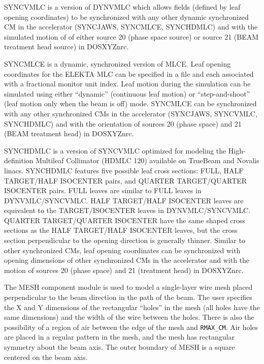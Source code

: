 \documentclass[12pt,twoside]{article}
\begin{document}
SYNCVMLC is a version of DYNVMLC which allows fields (defined by leaf opening
coordinates) to be synchronized with any other dynamic synchronized CM in
the accelerator (SYNCJAWS, SYNCMLCE, SYNCHDMLC) and with the simulated motion of
of either source 20 (phase space source) or source 21 (BEAM treatment head source)
in DOSXYZnrc\cite{Wa05}.

SYNCMLCE is a dynamic, synchronized version of MLCE.  Leaf opening coordinates for
the ELEKTA MLC
can be specified in a file and each associated with a fractional monitor
unit index.  Leaf motion during the simulation can be simulated using
either ``dynamic'' (continuous leaf motion) or ``step-and-shoot'' (leaf motion
only when the beam is off) mode.  SYNCMLCE can be synchronized with any
other synchronized CMs in the accelerator (SYNCJAWS, SYNCVMLC, SYNCHDMLC) and
with the orientation of sources 20 (phase space) and 21 (BEAM treatment head) in
DOSXYZnrc\cite{Wa05}.

SYNCHDMLC is a version of SYNCVMLC optimized for modeling the High-definition Multileaf
Collimator (HDMLC 120) available on TrueBeam and Novalis linacs.  SYNCHDMLC features five
possible leaf cross sections: FULL, HALF TARGET/HALF ISOCENTER pairs, and QUARTER TARGET/QUARTER ISOCENTER
pairs.  FULL leaves are similar to FULL leaves in DYNVMLC/SYNCVMLC.  HALF TARGET/HALF ISOCENTER leaves are
equivalent to the TARGET/ISOCENTER leaves in DYNVMLC/SYNCVMLC. QUARTER TARGET/QUARTER ISOCENTER have the
same shaped cross sections as the HALF TARGET/HALF ISOCENTER leaves, but the cross section perpendicular to
the opening direction is generally thinner.  Similar to other synchronized CMs, leaf opening
coordinates can be synchronized with opening dimensions of other synchronized CMs in the accelerator
and with the motion of sources 20 (phase space) and 21 (treatment head) in DOSXYZnrc\cite{Wa05}.

The MESH component module is used to model a single-layer wire mesh placed
perpendicular to the beam direction in the path of the beam.  The user
specifies the X and Y dimensions of the rectangular ``holes'' in the mesh
(all holes have the same dimensions) and the width of the wire between the
holes.  There is also the possibility of a region of air between the edge
of the mesh and \verb+RMAX_CM+.  Air holes are placed in a regular pattern
in the mesh, and the mesh has rectangular symmetry about the beam axis.
The outer boundary of MESH is a square centered on the beam axis.
\end{document}
